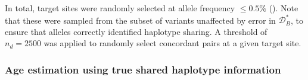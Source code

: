 In total,  target sites were randomly selected at allele frequency ${\leq 0.5\%}$ (\fk{[2,25]}).
Note that these were sampled from the subset of variants unaffected by error in $\mathcal{D}_B^{\ast}$, to ensure that alleles correctly identified haplotype sharing.
A threshold of ${n_d = \num{2500}}$ was applied to randomly select concordant pairs at a given target site.


% 

%
\subsubsection{Age estimation using true shared haplotype information}
%

